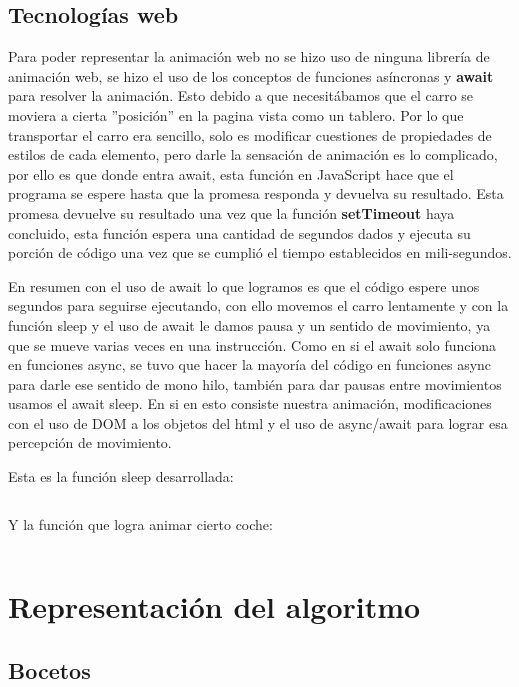 \documentclass[12 pt]{report}
\begin{document}
\section{Tecnologías web}
Para poder representar la animación web no se hizo uso de ninguna librería de animación web, se hizo el uso de los conceptos de funciones asíncronas y \textbf{await} para resolver la animación. Esto debido a que necesitábamos que el carro se moviera a cierta ''posición'' en la pagina vista como un tablero. Por lo que transportar el carro era sencillo, solo es modificar cuestiones de propiedades de estilos de cada elemento, pero darle la sensación de animación es lo complicado, por ello es que donde entra await, esta función en JavaScript hace que el programa se espere hasta que la promesa responda y devuelva su resultado. Esta promesa devuelve su resultado una vez que la función \textbf{setTimeout} haya concluido, esta función espera una cantidad de segundos dados y ejecuta su porción de código una vez que se cumplió el tiempo establecidos en mili-segundos.

En resumen con el uso de await lo que logramos es que el código espere unos segundos para seguirse ejecutando, con ello movemos el carro lentamente y con la función sleep y el uso de await le damos pausa y un sentido de movimiento, ya que se mueve varias veces en una instrucción. Como en si el await solo funciona en funciones async, se tuvo que hacer la mayoría del código en funciones async para darle ese sentido de mono hilo, también para dar pausas entre movimientos usamos el await sleep. En si en esto consiste nuestra animación, modificaciones con el uso de DOM a los objetos del html y el uso de async/await para lograr esa percepción de movimiento.

Esta es la función sleep desarrollada:
\inputminted[firstline = 117, lastline = 119]{js}{../PaginaWeb/js/main.js}
Y la función que logra animar cierto coche:
\inputminted[firstline = 121, lastline = 149]{js}{../PaginaWeb/js/main.js}
\chapter{Representación del algoritmo}
\section{Bocetos}
\end{document}
